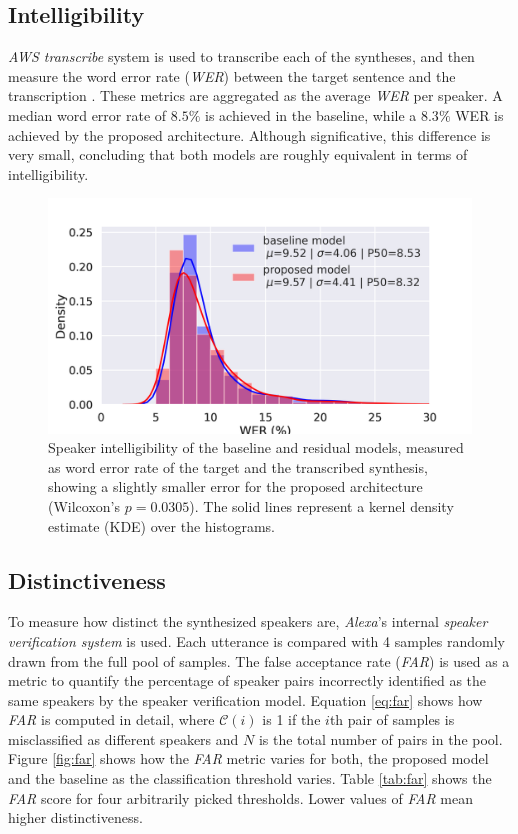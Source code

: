  \subsection{Intelligibility}
\textit{AWS transcribe} system is used to transcribe each of the syntheses, and then measure the word error rate (\textit{WER}) between the target sentence and the transcription \autocite{uday2019}. These metrics are aggregated as the average \textit{WER} per speaker. A median word error rate of $8.5\%$ is achieved in the baseline, while a $8.3\%$ WER is achieved by the proposed architecture. Although significative, this difference is very small, concluding that both models are roughly equivalent in terms of intelligibility.


\begin{figure}[h]
	\centering
	\includegraphics[width=0.7\linewidth]{tts/images/wer}
	\caption[Speaker intelligibility curves for the TTS models]{Speaker intelligibility of the baseline and residual models, measured as word error rate of the target and the transcribed synthesis, showing a slightly smaller error for the proposed architecture (Wilcoxon's $p=0.0305$). The solid lines represent a kernel density estimate (KDE) over the histograms.}
	\label{fig:wer}
\end{figure}


\subsection{Distinctiveness}
To measure how distinct the synthesized speakers are, \textit{Alexa}'s internal \textit{speaker verification system} is used.  Each utterance is compared with 4 samples randomly drawn from the full pool of samples. The false acceptance rate (\textit{FAR}) is used as a metric to quantify the percentage of speaker pairs incorrectly identified as the same speakers by the speaker verification model. Equation \ref{eq:far} shows how \textit{FAR} is computed in detail, where $\mathcal{C}(i)$ is 1 if the $i$th pair of samples is misclassified as different speakers and $N$ is the total number of pairs in the pool. Figure \ref{fig:far} shows how the \textit{FAR} metric varies for both, the proposed model and the baseline as the classification threshold varies. Table \ref{tab:far} shows the \textit{FAR} score for four arbitrarily picked thresholds. Lower values of \textit{FAR} mean higher distinctiveness.

